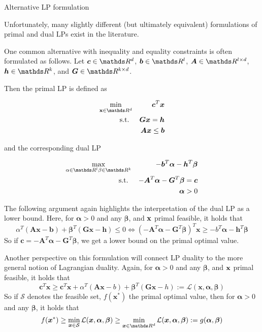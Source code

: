 \documentclass[11pt,compress,t,notes=noshow, xcolor=table]{beamer}
\begin{document}
\begin{vbframe}{Alternative LP formulation}

Unfortunately, many slightly different (but ultimately equivalent) formulations of primal and dual LPs exist in the literature. 

One common alternative with inequality and equality constraints is often formulated as
follows. Let $\bm{c} \in \R^d$, $\bm{b} \in \R^l$, $\bm{A} \in \R^{l \times d}$, $\bm{h} \in \R^k$, and $\bm{G} \in \R^{k \times d}$. 

Then the primal LP is defined as 

\begin{eqnarray*}
 \min_{\xv \in \R^d} && \bm{c}^T\bm{x} \\
\text{s.t. } && \bm{G} \bm{x} = \bm{h} \\
             && \bm{A} \bm{x} \le \bm{b} 
\end{eqnarray*}

\framebreak

and the corresponding dual LP 

\begin{eqnarray*}
 \max_{\alpha \in \R^l \beta \in \R^k} && -\bm{b}^T\bm{\alpha} -\bm{h}^T\bm{\beta} \\
\text{s.t. } && -\bm{A}^T \bm{\alpha} - \bm{G}^T \bm{\beta} = \bm{c}\\
             && \bm{\alpha} > 0 
\end{eqnarray*}

The following argument again highlights the interpretation of the dual
LP as a lower bound.
Here, for $\bm{\alpha}>0$ and any $\bm{\beta}$, and $\mathbf{x}$ primal feasible, it holds that 
$$
    \alpha^T (\bm{A} \bm{x} - \bm{b}) + \bm{\beta}^T (\bm{G} \bm{x} - \bm{h}) \le 0
    \iff (-\bm{A}^T \bm{\alpha} - \bm{G}^T \bm{\beta})^T \bm{x} \geq -b^T \bm{\alpha} - \bm{h}^T \bm{\beta}
$$
So if $\bm{c} = -\bm{A}^T \bm{\alpha} - \bm{G}^T \bm{\beta}$, we get a lower bound on the
primal optimal value.

\framebreak

Another perspective on this formulation will connect LP duality to the more general notion of Lagrangian duality. Again, for $\bm{\alpha}>0$ and any $\bm{\beta}$, and $\mathbf{x}$ primal feasible, it holds that
$$
\bm{c}^T \bm{x} \ge \bm{c}^T \bm{x} + \alpha^T (\bm{A} \bm{x} - b) + \bm{\beta}^T (\bm{G} \bm{x} - h) := \mathcal{L}(\bm{x},\bm{\alpha},\bm{\beta})
$$
So if $\mathcal{S}$ denotes the feasible set, $f(\bm{x}^*)$ the primal optimal value, then for $\bm{\alpha}>0$ and any $\bm{\beta}$, it holds that
$$
    f(\bm{x}^*) \ge \min_{\bm{x} \in \mathcal{S}}\mathcal{L}(\bm{x},\bm{\alpha},\bm{\beta}) \ge \min_{\bm{x} \in \R^d} \mathcal{L}(\bm{x},\bm{\alpha},\bm{\beta}) := g(\bm{\alpha},\bm{\beta})
$$


\end{vbframe}
\end{document}
